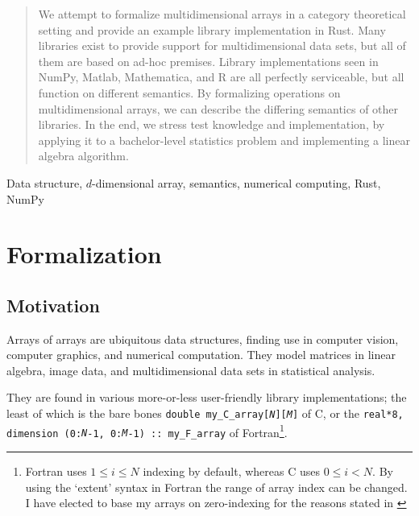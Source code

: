 \documentclass{DIKU-report-variant}
\begin{document}
\maketitle

\begin{abstract}
  We attempt to formalize multidimensional arrays in a category theoretical
  setting and provide an example library implementation in Rust.
  Many libraries exist to provide support for multidimensional data sets, but all
  of them are based on ad-hoc premises.
  Library implementations seen in NumPy, Matlab, Mathematica, and R are all
  perfectly serviceable, but all function on different semantics.
  By formalizing operations on multidimensional arrays, we can
  describe the differing semantics of other libraries.
  In the end, we stress test knowledge and implementation, by applying it to
  a bachelor-level statistics problem and implementing a linear algebra algorithm.
\end{abstract}

\begin{keywords}
  Data structure, \(d\)-dimensional array, semantics, numerical computing, Rust, NumPy
\end{keywords}


\setcounter{tocdepth}{2}
\tableofcontents

\chapter{Formalization}

\section{Motivation}

Arrays of arrays are ubiquitous data structures, finding use
in computer vision, computer graphics, and numerical computation.
They model matrices in linear algebra, image data, and multidimensional data sets in statistical analysis.

They are found in various more-or-less user-friendly library implementations;
the least of which is the bare bones \texttt{double my\_C\_array[\textit{N}][\textit{M}]} of
C, or the \texttt{real*8, dimension (0:\textit{N}-1, 0:\textit{M}-1) :: my\_F\_array} of
Fortran\footnote{Fortran uses \(1\le i\le N\) indexing by default, whereas C uses \(0\le i<N\).
By using the `extent' syntax in Fortran the range of array index can be changed. I have elected
to base my arrays on zero-indexing for the reasons stated in \cite{EWD831}}.
\end{document}
